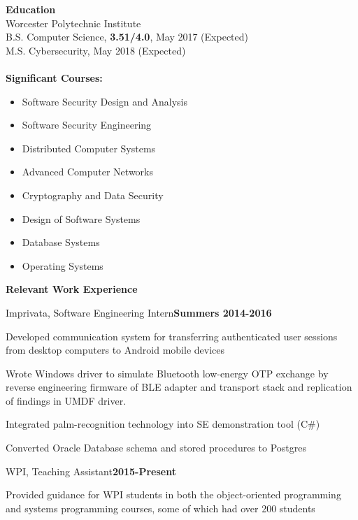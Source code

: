 \documentclass[11pt,oneside]{letter}
\newenvironment{tightitemize}{\itemize\addtolength{\itemsep}{-0.2em}}{\enditemize}
\begin{document}
{\bf{\Large Education}}\\
Worcester Polytechnic Institute \\
B.S. Computer Science, {\bf3.51/4.0}, May 2017 (Expected)\\
M.S. Cybersecurity, May 2018 (Expected)\\\\
{\bf Significant Courses:}
\vspace{-0.15in}
{\footnotesize
\begin{multicols}{2}
\begin{itemize}[leftmargin=0.3in]
    \addtolength{\itemsep}{-0.6em}
    \item Software Security Design and Analysis
    \item Software Security Engineering
    \item Distributed Computer Systems
    \item Advanced Computer Networks
    \item Cryptography and Data Security
    \item Design of Software Systems
    \item Database Systems
    \item Operating Systems
\end{itemize}
\end{multicols}}
{\bf{\Large Relevant Work Experience}}

Imprivata, Software Engineering Intern\hfill{\bf{Summers 2014-2016}}
\vspace{-0.13in}
{\footnotesize 
\begin{tightitemize}
    \item Developed communication system for transferring authenticated user sessions from desktop computers to Android mobile devices
    \item Wrote Windows driver to simulate Bluetooth low-energy OTP exchange by reverse engineering firmware of BLE adapter and transport stack and replication of findings in UMDF driver.
    \item Integrated palm-recognition technology into SE demonstration tool (C\#)
    \item Converted Oracle Database schema and stored procedures to Postgres
\end{tightitemize}}

WPI, Teaching Assistant\hfill{\bf{2015-Present}}\\
\vspace{-0.28in}
{\footnotesize 
\begin{tightitemize}
    \item Provided guidance for WPI students in both the object-oriented programming and systems programming courses, some of which had over 200 students
\end{tightitemize}}
\end{document}
